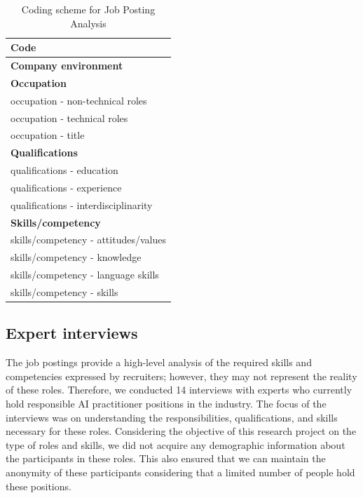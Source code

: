 \documentclass[sigconf]{acmart}
\begin{document}
\begin{table}[ht]
\caption{Coding scheme for Job Posting Analysis}
\label{tab:JP_coding}
\begin{tabular}{l}
\textbf{Code}                         \\ \hline
\textbf{Company environment}          \\ \hline
\textbf{Occupation}    \\               \hline
occupation - non-technical roles                      \\ \hline
occupation - technical roles \\ \hline
occupation - title                                     \\ \hline
\textbf{Qualifications}                                      \\ \hline
qualifications - education                                \\ \hline
qualifications - experience  \\ \hline
qualifications - interdisciplinarity  \\ \hline
\textbf{Skills/competency}                             \\ \hline
skills/competency - attitudes/values                   \\ \hline
skills/competency - knowledge  \\ \hline
skills/competency - language skills  \\ \hline
skills/competency - skills \\ \hline
\end{tabular}
\end{table}


\subsection{Expert interviews}
The job postings provide a high-level analysis of the required skills and competencies expressed by recruiters; however, they may not represent the reality of these roles. Therefore, we conducted 14 interviews with experts who currently hold responsible AI practitioner positions in the industry. The focus of the interviews was on understanding the responsibilities, qualifications, and skills necessary for these roles. Considering the objective of this research project on the type of roles and skills, we did not acquire any demographic information about the participants in these roles. This also ensured that we can maintain the anonymity of these participants considering that a limited number of people hold these positions.  
\end{document}
